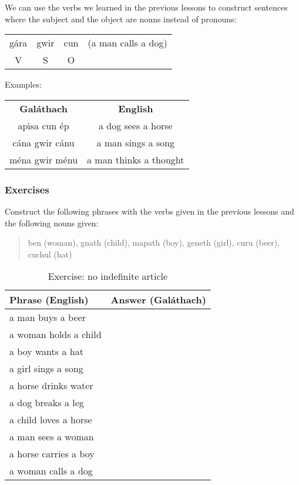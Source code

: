 We can use the verbs we learned in the previous lessons to construct sentences where the subject and the object are nouns instead of pronouns:
\begin{table}[H]
\begin{tabular}{cccc}
  g\'{a}ra & gwir & cun & (a man calls a dog)\\
  V & S & O &
\end{tabular}
\label{examples_vso}
\end{table}

Examples:
\begin{table}[H]
\centering
\begin{tabular}{cc}
  \toprule
  \textbf{Gal\'{a}thach} & \textbf{English}\\
  \cmidrule(lr){1-1}\cmidrule(lr){2-2}
  ap\'{\i}sa cun \'{e}p & a dog sees a horse\\
  c\'{a}na gwir c\'{a}nu & a man sings a song\\
  m\'{e}na gwir m\'{e}nu & a man thinks a thought\\
  \bottomrule
\end{tabular}
\label{examples_vso_more_examples}
\end{table}

\newpage
\subsubsection{Exercises}

Construct the following phrases with the verbs given in the previous lessons and the following nouns given:

\begin{quote}
ben (woman), gnath (child), mapath (boy), geneth (girl), curu (beer), cuchul (hat)
\end{quote}

\begin{table}[H]
\centering
\begin{tabular}{|l|M{10.0cm}|}
  \toprule
  \textbf{Phrase (English)} & \textbf{Answer (Gal\'{a}thach)}\\
  \toprule
  a man buys a beer & \\
  \midrule
  a woman holds a child & \\
  \midrule
  a boy wants a hat & \\
  \midrule
  a girl sings a song & \\
  \midrule
  a horse drinks water & \\
  \midrule
  a dog breaks a leg & \\
  \midrule
  a child loves a horse & \\
  \midrule
  a man sees a woman & \\
  \midrule
  a horse carries a boy & \\
  \midrule
  a woman calls a dog & \\
  \bottomrule
\end{tabular}
\label{exercise_no_indefinite_article}
\caption{Exercise: no indefinite article}
\end{table}

